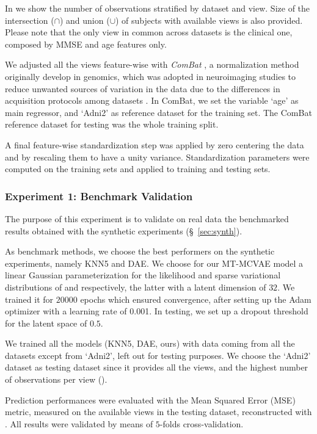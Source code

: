 In  we show the number of observations stratified by dataset and view.
Size of the intersection ($\cap$) and union ($\cup$) of subjects with available views is also provided.
Please note that the only view in common across datasets is the clinical one, composed by MMSE and age features only.

We adjusted all the views feature-wise with \textit{ComBat} \citep{combat}, a normalization method originally develop in genomics,
which was adopted in neuroimaging studies to reduce unwanted sources of variation in the data due to the differences in acquisition protocols among datasets \citep{Fortin2017, Fortin2018, Orlhac2020}.
In ComBat, we set the variable `age' as main regressor, and `Adni2' as reference dataset for the training set.
The ComBat reference dataset for testing was the whole training split.

A final feature-wise standardization step was applied by zero centering the data and by rescaling them to have a unity variance.
Standardization parameters were computed on the training sets and applied to training and testing sets.

\subsubsection{Experiment 1: Benchmark Validation}


The purpose of this experiment is to validate on real data the benchmarked results obtained with the synthetic experiments (\S~\ref{sec:synth}).

As benchmark methods, we choose the best performers on the synthetic experiments, namely KNN5 and DAE.
We choose for our MT-MCVAE model a linear Gaussian parameterization for the likelihood and sparse variational distributions of  and  respectively,
the latter with a latent dimension of $32$.
We trained it for $20000$ epochs which ensured convergence, after setting up the Adam optimizer with a learning rate of 0.001.
In testing, we set up a dropout threshold for the latent space of $0.5$.

We trained all the models (KNN5, DAE, ours) with data coming from all the datasets except from `Adni2', left out for testing purposes.
We choose the `Adni2' dataset as testing dataset since it provides all the views, and the highest number of observations per view ().

Prediction performances were evaluated with the Mean Squared Error (MSE) metric, measured on the available views in the testing dataset, reconstructed with .
All results were validated by means of $5$-folds cross-validation.

